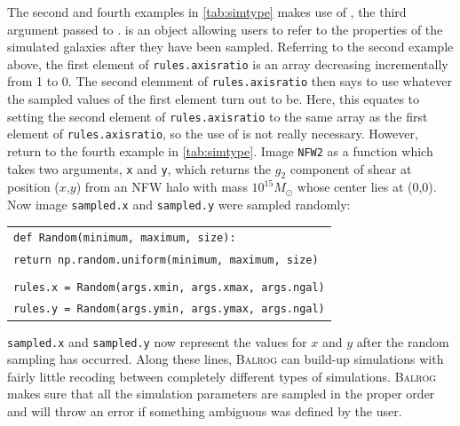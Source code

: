 \documentclass[12pt]{book}
\newcommand{\balrog}{\textsc{Balrog}}
\begin{document}
The second and fourth examples in \autoref{tab:simtype} makes use of \simsamp{}, the third argument
passed to \simfunc{}. \simsamp{} is an object allowing users to refer to the properties of
the simulated galaxies after they have been sampled. Referring to the second example above,
the first element of \texttt{rules.axisratio} is an array decreasing incrementally from 1 to 0.
The second elemment of \texttt{rules.axisratio} then says to use whatever the sampled values of
 the first element turn out to be. Here, this equates to setting the second element of \texttt{rules.axisratio}
 to the same array as the first element of \texttt{rules.axisratio}, so the use of \simsamp{} is not 
 really necessary. However, return to the fourth example in \autoref{tab:simtype}. Image \texttt{NFW2}
 as a function which takes two arguments, \texttt{x} and \texttt{y}, which returns the $g_2$ component
 of shear at position ($x$,$y$) from an NFW halo with mass $10^{15} M_{\odot}$ whose center lies at (0,0).
 Now image \texttt{sampled.x} and \texttt{sampled.y} were sampled randomly:
 
 \setlength{\tabcolsep}{0pt}
\begin{longtabu} to \linewidth {X}
\texttt{def Random(minimum, maximum, size):} \\
\hspace{20pt}  \texttt{return np.random.uniform(minimum, maximum, size)}\\
\\
\texttt{rules.x = Random(args.xmin, args.xmax, args.ngal)} \\
\texttt{rules.y = Random(args.ymin, args.ymax, args.ngal)}
\end{longtabu}
\setlength{\tabcolsep}{6pt}
\addtocounter{table}{-1}
 
\noindent \texttt{sampled.x} and \texttt{sampled.y} now represent the values
for $x$ and $y$ after the random sampling has occurred. 
Along these lines, \balrog{} can build-up simulations with fairly little recoding between completely
different types of simulations.
\balrog{} makes sure that all the simulation parameters are sampled
in the proper order and will throw an error if something ambiguous was defined
by the user.
\end{document}
